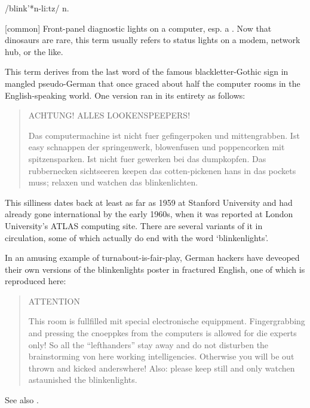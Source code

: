  /blink'*n-li:tz/ n.

[common] Front-panel diagnostic lights on a computer, esp. a
. Now that dinosaurs are rare, this term usually refers to
status lights on a modem, network hub, or the like.

This term derives from the last word of the famous blackletter-Gothic sign in
mangled pseudo-German that once graced about half the computer rooms in the
English-speaking world. One version ran in its entirety as follows:

\begin{quotation}
    \begin{center}
        ACHTUNG! ALLES LOOKENSPEEPERS!
    \end{center}

    Das computermachine ist nicht fuer gefingerpoken und mittengrabben. Ist easy
    schnappen der springenwerk, blowenfusen und poppencorken mit spitzensparken.
    Ist nicht fuer gewerken bei das dumpkopfen. Das rubbernecken sichtseeren
    keepen das cotten-pickenen hans in das pockets muss; relaxen und watchen das
    blinkenlichten.
\end{quotation}

This silliness dates back at least as far as 1959 at Stanford University and had
already gone international by the early 1960s, when it was reported at London
University's ATLAS computing site. There are several variants of it in
circulation, some of which actually do end with the word `blinkenlights'.

In an amusing example of turnabout-is-fair-play, German hackers have deveoped
their own versions of the blinkenlights poster in fractured English, one of
which is reproduced here:

\begin{quotation}
    \begin{center}
        ATTENTION
    \end{center}

    This room is fullfilled mit special electronische equippment. Fingergrabbing
    and pressing the cnoeppkes from the computers is allowed for die experts
    only! So all the ``lefthanders'' stay away and do not disturben the
    brainstorming von here working intelligencies. Otherwise you will be out
    thrown and kicked anderswhere! Also: please keep still and only watchen
    astaunished the blinkenlights.
\end{quotation}

See also .

